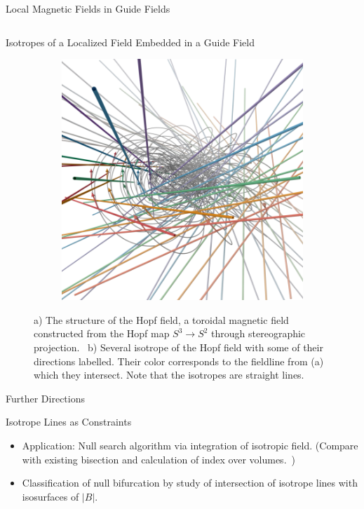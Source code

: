 \documentclass[final]{beamer}
\newlength{\onecolwid}
\newlength{\twocolwid}
\begin{document}
\begin{frame}[t]
\begin{columns}[t]
\begin{column}{\twocolwid}
\begin{block}{\huge{Local Magnetic Fields in Guide Fields}}
\begin{columns}[t,totalwidth=\twocolwid]
\begin{column}{\onecolwid}
\begin{block}{Isotropes of a Localized Field Embedded in a Guide Field}
\begin{figure}
\begin{subfigure}[b]{.45\textwidth}
      \includegraphics[width=\textwidth]{fig/hopftropes.png}
      \caption{}
    \end{subfigure}
    \caption{
      a) The structure of the Hopf field, a toroidal magnetic field
      constructed from the Hopf map $S^3\rightarrow S^2$ through stereographic projection.~\cite{smiet2017hopf}
      b) Several isotrope of the Hopf field with some of their directions labelled.
      Their color corresponds to the fieldline from (a) which they intersect.
      Note that the isotropes are straight lines.
    }
  \end{figure}
\end{block}

\begin{block}{\huge Further Directions}
  \begin{block}{Isotrope Lines as Constraints}
    \begin{itemize}
      \item Application: Null search algorithm via integration of isotropic field.
      (Compare with existing bisection and calculation of index over volumes.~\cite{greene1992locating})
      \item Classification of null bifurcation by study of intersection of isotrope lines
        with isosurfaces of $|B|$.
    \end{itemize}
  \end{block}


\end{block}
\end{column}
\end{columns}
\end{block}
\end{column}
\end{columns}
\end{frame}
\end{document}
